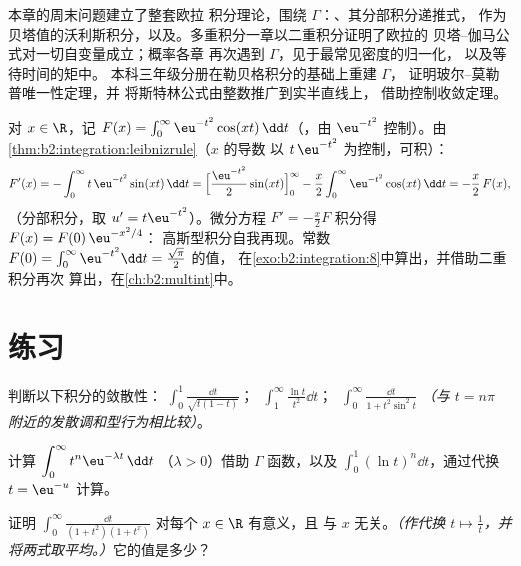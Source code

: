 \begin{remark}
本章的周末问题建立了整套欧拉
积分理论，围绕 $\Gamma$：、其分部积分递推式，
作为贝塔值的沃利斯积分，以及。多重积分一章以二重积分证明了欧拉的
贝塔–伽马公式对一切自变量成立；概率各章
再次遇到 $\Gamma$，见于最常见密度的归一化，
以及等待时间的矩中。
本科三年级分册在勒贝格积分的基础上重建 $\Gamma$，
证明玻尔–莫勒普唯一性定理，并
将斯特林公式由整数推广到实半直线上，
借助控制收敛定理。
\end{remark}

\begin{example}[通过求导的一个经典计算]\label{ex:b2:integration:laplace}
对 $x \in \R$，记 $F(x) = \int_0^{\infty} \eu^{-t^2}\cos(xt)\,\dd
t$（，由 $\eu^{-t^2}$ 控制）。由
\cref{thm:b2:integration:leibnizrule}（$x$ 的导数
以 $t\,\eu^{-t^2}$ 为控制，可积）：
\[
F'(x) = -\int_0^\infty t\,\eu^{-t^2}\sin(xt)\,\dd t
= \Bigl[\frac{\eu^{-t^2}}{2}\sin(xt)\Bigr]_0^\infty
- \frac x2\int_0^\infty \eu^{-t^2}\cos(xt)\,\dd t
= -\frac x2\,F(x),
\]
（分部积分，取 $u' = t\eu^{-t^2}$）。微分方程 $F' =
-\frac x2 F$ 积分得 $F(x) = F(0)\,\eu^{-x^2/4}$：
高斯型积分自我再现。常数 $F(0) =
\int_0^\infty \eu^{-t^2}\dd t = \frac{\sqrt\pi}{2}$ 的值，
在\cref{exo:b2:integration:8}中算出，并借助二重积分再次
算出，在\cref{ch:b2:multint}中。
\end{example}

\section{练习}

\begin{exercise}[$\star$]\label{exo:b2:integration:1}
判断以下积分的敛散性：
$\displaystyle\int_0^1 \frac{\dd t}{\sqrt{t(1-t)}}$；
$\;\displaystyle\int_1^\infty \frac{\ln t}{t^2}\dd t$；
$\;\displaystyle\int_0^\infty \frac{\dd t}{1 + t^2\sin^2 t}$
\emph{（与 $t =
n\pi$ 附近的发散调和型行为相比较）}。
\end{exercise}

\begin{exercise}[$\star$]\label{exo:b2:integration:2}
计算 $\displaystyle\int_0^\infty t^n \eu^{-\lambda t}\,\dd t$
（$\lambda > 0$）借助 $\Gamma$ 函数，以及
$\displaystyle\int_0^1 (\ln t)^n \dd t$，通过代换 $t =
\eu^{-u}$ 计算。
\end{exercise}

\begin{exercise}[$\star$]\label{exo:b2:integration:3}
证明 $\displaystyle\int_0^{\infty} \frac{\dd t}{(1 +
t^2)(1 + t^x)}$ 对每个 $x \in \R$ 有意义，且
与 $x$ 无关。\emph{（作代换 $t \mapsto \frac1t$，并
将两式取平均。）}它的值是多少？
\end{exercise}

